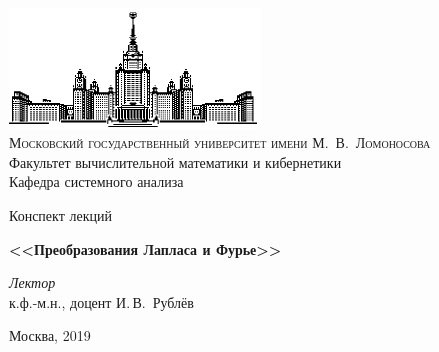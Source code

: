 \thispagestyle{empty}
\begin{center}
    \ \vspace{-3cm}

    \includegraphics[width=0.5\textwidth]{title_page/msu.eps}\\

    {\scshape Московский государственный университет имени М.~В.~Ломоносова}\\
    Факультет вычислительной математики и кибернетики\\
    Кафедра системного анализа

    \vfill

    {\LARGE Конспект лекций}

    \vspace{1cm}

    {\Huge\bfseries <<Преобразования Лапласа и Фурье>>}
\end{center}

\vspace{3cm}

\begin{flushright}
    \large
    \textit{Лектор}\\
    к.ф.-м.н., доцент И.\,В.~Рублёв
\end{flushright}

\vfill

\begin{center}
    Москва, 2019
\end{center}

\clearpage